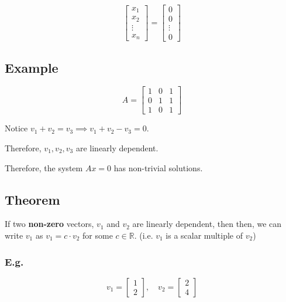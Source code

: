 \documentclass[12pt]{article}
\begin{document}
\begin{equation*}
  \begin{bmatrix}
    x_1 \\ x_2 \\ \vdots \\ x_n
  \end{bmatrix}
  = 
  \begin{bmatrix}
    0 \\ 0 \\ \vdots \\ 0
  \end{bmatrix}
\end{equation*}

\subsection{Example}

\begin{equation*}
  A = \begin{bmatrix}
    1 & 0 & 1 \\
    0 & 1 & 1 \\
    1 & 0 & 1
  \end{bmatrix}
\end{equation*}

Notice $v_1 + v_2 = v_3 \implies v_1 + v_2 - v_3 = 0$.

Therefore, $v_1, v_2, v_3$ are linearly dependent.

Therefore, the system $Ax=0$ has non-trivial solutions.

\subsection{Theorem}

If two \textbf{non-zero} vectors, $v_1$ and $v_2$ are linearly dependent, then
then, we can write $v_1$ as $v_1 = c \cdot v_2$ for some $c \in \mathbb{R}$.
(i.e. $v_1$ is a scalar multiple of $v_2$)

\subsubsection{E.g.}

\[
v_1 = \begin{bmatrix} 1 \\ 2 \end{bmatrix}, \quad v_2 = \begin{bmatrix} 2 \\ 4 \end{bmatrix}
\]
\end{document}
